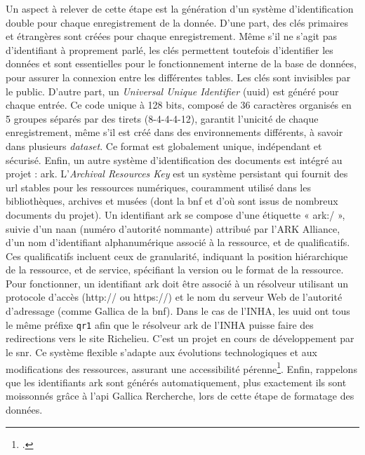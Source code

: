 Un aspect à relever de cette étape est la génération d'un système d'identification double pour chaque enregistrement de la donnée. D'une part, des clés primaires et étrangères sont créées pour chaque enregistrement. Même s'il ne s'agit pas d'identifiant à proprement parlé, les clés permettent toutefois d'identifier les données et sont essentielles pour le fonctionnement interne de la base de données, pour assurer la connexion entre les différentes tables. Les clés sont invisibles par le public. D'autre part, un \textit{Universal Unique Identifier} (\acrshort{uuid}) est généré pour chaque entrée. Ce code unique à 128 bits, composé de 36 caractères organisés en 5 groupes séparés par des tirets (8-4-4-4-12), garantit l'unicité de chaque enregistrement, même s'il est créé dans des environnements différents, à savoir dans plusieurs \textit{dataset}. Ce format est globalement unique, indépendant et sécurisé. Enfin, un autre système d'identification des documents est intégré au projet : \acrshort{ark}. L'\textit{Archival Resources Key} est un système persistant qui fournit des \acrshort{url} stables pour les ressources numériques, couramment utilisé dans les bibliothèques, archives et musées (dont la \acrshort{bnf} et d'où sont issus de nombreux documents du projet). Un identifiant \acrshort{ark} se compose d'une étiquette « \acrshort{ark}:/ », suivie d'un \acrshort{naan} (numéro d'autorité nommante) attribué par l'ARK Alliance, d'un nom d'identifiant alphanumérique associé à la ressource, et de qualificatifs. Ces qualificatifs incluent ceux de granularité, indiquant la position hiérarchique de la ressource, et de service, spécifiant la version ou le format de la ressource. Pour fonctionner, un identifiant \acrshort{ark} doit être associé à un résolveur utilisant un protocole d'accès (http:// ou https://) et le nom du serveur Web de l'autorité d'adressage (comme Gallica de la \acrshort{bnf}). Dans le cas de l'INHA, les \acrshort{uuid} ont tous le même préfixe \texttt{qr1} afin que le résolveur \acrshort{ark} de l'INHA puisse faire des redirections vers le site Richelieu. C'est un projet en cours de développement par le \acrshort{snr}. Ce système flexible s'adapte aux évolutions technologiques et aux modifications des ressources, assurant une accessibilité  pérenne\footcite{POCHONsysteme2021}. Enfin, rappelons que les identifiants \acrshort{ark} sont générés automatiquement, plus exactement ils sont moissonnés grâce à l'\acrshort{api} Gallica Rercherche, lors de cette étape de formatage des données. 

